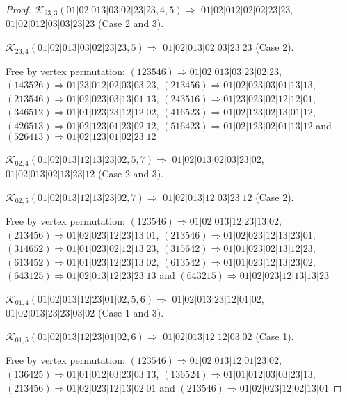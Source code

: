 \documentclass[12pt]{article}
\theoremstyle{plain}
\theoremstyle{definition}
\theoremstyle{remark}
\newcommand{\fancy}[1]{\mathcal{#1}}
\def\K{\fancy{K}}
\begin{document}
\begin{proof}
	
	
	\bigskip
	
	$\K_{23,3}(01|02|013|03|02|23|23,4, 5)\Rightarrow $ $01|02|012|02|02|23|23$, $01|02|012|03|03|23|23$ (Case 2 and 3).
	
	$\K_{23,4}(01|02|013|03|02|23|23,5)\Rightarrow $ $01|02|013|02|03|23|23$ (Case 2).
	
	
	
	Free by vertex permutation: $(1 2 3 5 4 6)\Rightarrow 01|02|013|03|23|02|23$, $(1 4 3 5 2 6)\Rightarrow 01|23|012|02|03|03|23$, $(2 1 3 4 5 6)\Rightarrow 01|02|023|03|01|13|13$, $(2 1 3 5 4 6)\Rightarrow 01|02|023|03|13|01|13$, $(2 4 3 5 1 6)\Rightarrow 01|23|023|02|12|12|01$, $(3 4 6 5 1 2)\Rightarrow 01|01|023|23|12|12|02$, $(4 1 6 5 2 3)\Rightarrow 01|02|123|02|13|01|12$, $(4 2 6 5 1 3)\Rightarrow 01|02|123|01|23|02|12$, $(5 1 6 4 2 3)\Rightarrow 01|02|123|02|01|13|12$ and $(5 2 6 4 1 3)\Rightarrow 01|02|123|01|02|23|12$
	
	
	
	\bigskip
	
	$\K_{02,4}(01|02|013|12|13|23|02,5, 7)\Rightarrow $ $01|02|013|02|03|23|02$, $01|02|013|02|13|23|12$ (Case 2 and 3).
	
	$\K_{02,5}(01|02|013|12|13|23|02,7)\Rightarrow $ $01|02|013|12|03|23|12$ (Case 2).
	
	
	
	Free by vertex permutation: $(1 2 3 5 4 6)\Rightarrow 01|02|013|12|23|13|02$, $(2 1 3 4 5 6)\Rightarrow 01|02|023|12|23|13|01$, $(2 1 3 5 4 6)\Rightarrow 01|02|023|12|13|23|01$, $(3 1 4 6 5 2)\Rightarrow 01|01|023|02|12|13|23$, $(3 1 5 6 4 2)\Rightarrow 01|01|023|02|13|12|23$, $(6 1 3 4 5 2)\Rightarrow 01|01|023|12|23|13|02$, $(6 1 3 5 4 2)\Rightarrow 01|01|023|12|13|23|02$, $(6 4 3 1 2 5)\Rightarrow 01|02|013|12|23|23|13$ and $(6 4 3 2 1 5)\Rightarrow 01|02|023|12|13|13|23$
	
	
	
	\bigskip
	
	$\K_{01,4}(01|02|013|12|23|01|02,5, 6)\Rightarrow $ $01|02|013|23|12|01|02$, $01|02|013|23|23|03|02$ (Case 1 and 3).
	
	$\K_{01,5}(01|02|013|12|23|01|02,6)\Rightarrow $ $01|02|013|12|12|03|02$ (Case 1).
	
	
	
	Free by vertex permutation: $(1 2 3 5 4 6)\Rightarrow 01|02|013|12|01|23|02$, $(1 3 6 4 2 5)\Rightarrow 01|01|012|03|23|03|13$, $(1 3 6 5 2 4)\Rightarrow 01|01|012|03|03|23|13$, $(2 1 3 4 5 6)\Rightarrow 01|02|023|12|13|02|01$ and $(2 1 3 5 4 6)\Rightarrow 01|02|023|12|02|13|01$
	

\end{proof}
\end{document}
